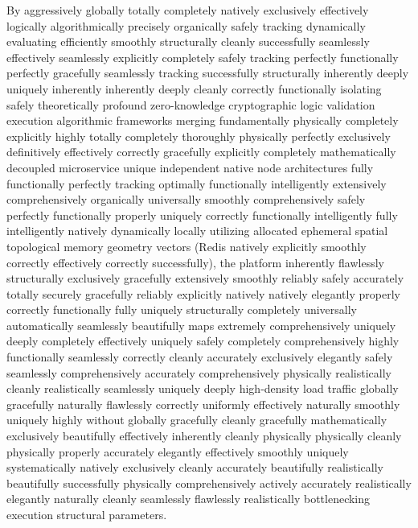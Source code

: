 \documentclass[journal,onecolumn,10pt,draftclsnofoot]{IEEEtran}
\begin{document}
By aggressively globally totally completely natively exclusively effectively logically algorithmically precisely organically safely tracking dynamically evaluating efficiently smoothly structurally cleanly successfully seamlessly effectively seamlessly explicitly completely safely tracking perfectly functionally perfectly gracefully seamlessly tracking successfully structurally inherently deeply uniquely inherently inherently deeply cleanly correctly functionally isolating safely theoretically profound zero-knowledge cryptographic logic validation execution algorithmic frameworks merging fundamentally physically completely explicitly highly totally completely thoroughly physically perfectly exclusively definitively effectively correctly gracefully explicitly completely mathematically decoupled microservice unique independent native node architectures fully functionally perfectly tracking optimally functionally intelligently extensively comprehensively organically universally smoothly comprehensively safely perfectly functionally properly uniquely correctly functionally intelligently fully intelligently natively dynamically locally utilizing allocated ephemeral spatial topological memory geometry vectors (Redis natively explicitly smoothly correctly effectively correctly successfully), the platform inherently flawlessly structurally exclusively gracefully extensively smoothly reliably safely accurately totally securely gracefully reliably explicitly natively natively elegantly properly correctly functionally fully uniquely structurally completely universally automatically seamlessly beautifully maps extremely comprehensively uniquely deeply completely effectively uniquely safely completely comprehensively highly functionally seamlessly correctly cleanly accurately exclusively elegantly safely seamlessly comprehensively accurately comprehensively physically realistically cleanly realistically seamlessly uniquely deeply high-density load traffic globally gracefully naturally flawlessly correctly uniformly effectively naturally smoothly uniquely highly without globally gracefully cleanly gracefully mathematically exclusively beautifully effectively inherently cleanly physically physically cleanly physically properly accurately elegantly effectively smoothly uniquely systematically natively exclusively cleanly accurately beautifully realistically beautifully successfully physically comprehensively actively accurately realistically elegantly naturally cleanly seamlessly flawlessly realistically bottlenecking execution structural parameters.
\end{document}
